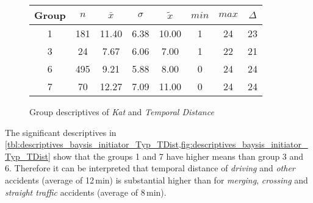 \begin{figure}[ht!]
	\centering
	\begin{minipage}{0.5\textwidth}
		\tiny
		\setlength{\tabcolsep}{4pt}
		\centering
		\begin{tabular}{c|c|c|c|c|c|c|c}
			\toprule
			Group & $n$ & $\bar{x}$ & $\sigma$ & $\tilde{x}$ & $min$ & $max$ & $\Delta$ \\
			\midrule
            1 & 181 & 11.40 & 6.38 & 10.00 & 1  & 24 & 23 \\ 
            3 & 24  & 7.67  & 6.06 & 7.00  & 1  & 22 & 21 \\ 
            6 & 495 & 9.21  & 5.88 & 8.00  & 0  & 24 & 24 \\ 
            7 & 70  & 12.27 & 7.09 & 11.00 & 0  & 24 & 24 \\ 
			\bottomrule
		\end{tabular}
		\label{tbl:descriptives_baysis_initiator_Typ_TDist}
	\end{minipage}%
	\begin{minipage}{0.55\textwidth}
		\data 
        \pgfplotstablesort[sort key=mean, sort cmp=float >]{\datasorted}{\data}
        \tiny
        \centering
		\label{fig:descriptives_baysis_initiator_Typ_TDist}
	\end{minipage}%
	\caption{Group descriptives of \textit{Kat} and \textit{Temporal Distance}}
\end{figure}
The significant descriptives in \cref{tbl:descriptives_baysis_initiator_Typ_TDist,fig:descriptives_baysis_initiator_Typ_TDist} show that the groups 1 and 7 have higher means than group 3 and 6. Therefore it can be interpreted that temporal distance of \textit{driving} and \textit{other} accidents (average of 12\,min) is substantial higher than for \textit{merging}, \textit{crossing} and \textit{straight traffic} accidents (average of 8\,min).

